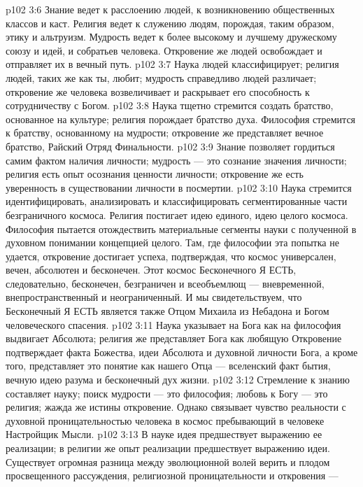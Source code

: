 \vs p102 3:6 \pc Знание ведет к расслоению людей, к возникновению общественных классов и каст. Религия ведет к служению людям, порождая, таким образом, этику и альтруизм. Мудрость ведет к более высокому и лучшему дружескому союзу и идей, и собратьев человека. Откровение же людей освобождает и отправляет их в вечный путь.
\vs p102 3:7 Наука людей классифицирует; религия людей, таких же как ты, любит; мудрость справедливо людей различает; откровение же человека возвеличивает и раскрывает его способность к сотрудничеству с Богом.
\vs p102 3:8 Наука тщетно стремится создать братство, основанное на культуре; религия порождает братство духа. Философия стремится к братству, основанному на мудрости; откровение же представляет вечное братство, Райский Отряд Финальности.
\vs p102 3:9 Знание позволяет гордиться самим фактом наличия личности; мудрость --- это сознание значения личности; религия есть опыт осознания ценности личности; откровение же есть уверенность в существовании личности в посмертии.
\vs p102 3:10 \pc Наука стремится идентифицировать, анализировать и классифицировать сегментированные части безграничного космоса. Религия постигает идею единого, идею целого космоса. Философия пытается отождествить материальные сегменты науки с полученной в духовном понимании концепцией целого. Там, где философии эта попытка не удается, откровение достигает успеха, подтверждая, что космос универсален, вечен, абсолютен и бесконечен. Этот космос Бесконечного Я ЕСТЬ, следовательно, бесконечен, безграничен и всеобъемлющ --- вневременной, внепространственный и неограниченный. И мы свидетельствуем, что Бесконечный Я ЕСТЬ является также Отцом Михаила из Небадона и Богом человеческого спасения.
\vs p102 3:11 Наука указывает на Бога как на  философия выдвигает  Абсолюта; религия же представляет Бога как любящую  Откровение подтверждает  факта Божества, идеи Абсолюта и духовной личности Бога, а кроме того, представляет это понятие как нашего Отца --- вселенский факт бытия, вечную идею разума и бесконечный дух жизни.
\vs p102 3:12 Стремление к знанию составляет науку; поиск мудрости --- это философия; любовь к Богу --- это религия; жажда же истины  откровение. Однако связывает чувство реальности с духовной проницательностью человека в космос пребывающий в человеке Настройщик Мысли.
\vs p102 3:13 \pc В науке идея предшествует выражению ее реализации; в религии же опыт реализации предшествует выражению идеи. Существует огромная разница между эволюционной волей верить и плодом просвещенного рассуждения, религиозной проницательности и откровения --- 
